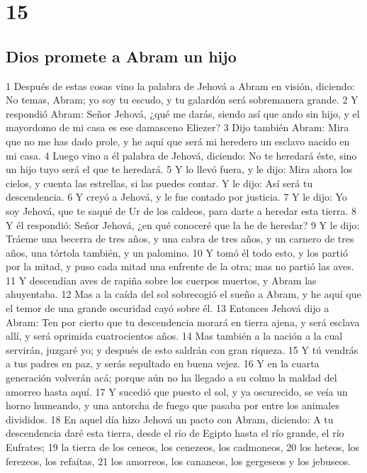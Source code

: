 \chapter{15}

\section{Dios promete a Abram un hijo}

1 Después de estas cosas vino la palabra de Jehová a Abram en visión, diciendo: No temas, Abram; yo soy tu escudo, y tu galardón será sobremanera grande.
2 Y respondió Abram: Señor Jehová, ¿qué me darás, siendo así que ando sin hijo, y el mayordomo de mi casa es ese damasceno Eliezer?
3 Dijo también Abram: Mira que no me has dado prole, y he aquí que será mi heredero un esclavo nacido en mi casa.
4 Luego vino a él palabra de Jehová, diciendo: No te heredará éste, sino un hijo tuyo será el que te heredará.
5 Y lo llevó fuera, y le dijo: Mira ahora los cielos, y cuenta las estrellas, si las puedes contar. Y le dijo: Así será tu descendencia.
6 Y creyó a Jehová, y le fue contado por justicia.
7 Y le dijo: Yo soy Jehová, que te saqué de Ur de los caldeos, para darte a heredar esta tierra.
8 Y él respondió: Señor Jehová, ¿en qué conoceré que la he de heredar?
9 Y le dijo: Tráeme una becerra de tres años, y una cabra de tres años, y un carnero de tres años, una tórtola también, y un palomino.
10 Y tomó él todo esto, y los partió por la mitad, y puso cada mitad una enfrente de la otra; mas no partió las aves.
11 Y descendían aves de rapiña sobre los cuerpos muertos, y Abram las ahuyentaba.
12 Mas a la caída del sol sobrecogió el sueño a Abram, y he aquí que el temor de una grande oscuridad cayó sobre él.
13 Entonces Jehová dijo a Abram: Ten por cierto que tu descendencia morará en tierra ajena, y será esclava allí, y será oprimida cuatrocientos años.
14 Mas también a la nación a la cual servirán, juzgaré yo; y después de esto saldrán con gran riqueza.
15 Y tú vendrás a tus padres en paz, y serás sepultado en buena vejez.
16 Y en la cuarta generación volverán acá; porque aún no ha llegado a su colmo la maldad del amorreo hasta aquí.
17 Y sucedió que puesto el sol, y ya oscurecido, se veía un horno humeando, y una antorcha de fuego que pasaba por entre los animales divididos.
18 En aquel día hizo Jehová un pacto con Abram, diciendo: A tu descendencia daré esta tierra, desde el río de Egipto hasta el río grande, el río Eufrates;
19 la tierra de los ceneos, los cenezeos, los cadmoneos,
20 los heteos, los ferezeos, los refaítas,
21 los amorreos, los cananeos, los gergeseos y los jebuseos.

